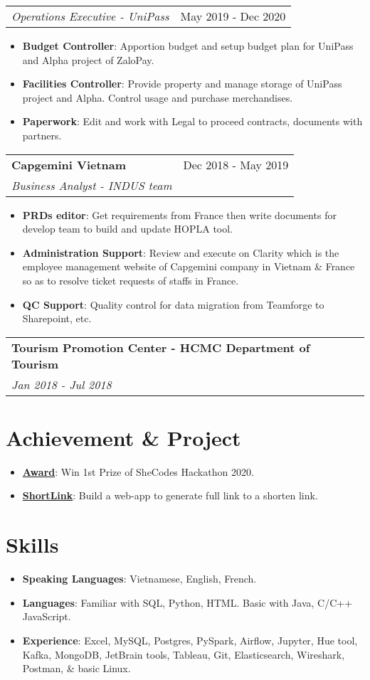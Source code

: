 \documentclass[letterpaper,11pt]{article}
\makeatletter
\newcommand{\resumeItem}[2]{
  \item\small{
    \textbf{#1}{: #2 \vspace{-2pt}}
  }
}
\newcommand{\resumeSubheading}[4]{
  \vspace{-1pt}
  \item
    \begin{tabular*}{0.97\textwidth}{l@{\extracolsep{\fill}}r}
      \textbf{#1} & #2 \\
      \textit{\small#3} & \textit{\small #4} \\
    \end{tabular*}\vspace{-5pt}
}
\newcommand{\resumeSubheadingNoTitle}[2]{
  \vspace{-1pt}
    \begin{tabular*}{0.97\textwidth}{l@{\extracolsep{\fill}}r}
      \textit{\small#1} & #2 \\
    \end{tabular*}\vspace{-5pt}
}
\newcommand{\resumeSubItem}[2]{\resumeItem{#1}{#2}\vspace{-4pt}}
\newcommand{\resumeSubHeadingListStart}{\begin{itemize}[leftmargin=*]}
\newcommand{\resumeSubHeadingListEnd}{\end{itemize}}
\newcommand{\resumeItemListStart}{\begin{itemize}}
\newcommand{\resumeItemListEnd}{\end{itemize}\vspace{-5pt}}
\makeatother
\begin{document}
    \resumeSubheadingNoTitle
      {Operations Executive - UniPass}{May 2019 - Dec 2020}
      \resumeItemListStart
        \resumeItem{Budget Controller}
          {Apportion budget and setup budget plan for UniPass and Alpha project of ZaloPay.} 
        \resumeItem{Facilities Controller}
          {Provide property and manage storage of UniPass project and Alpha. Control usage and purchase merchandises.}
        \resumeItem{Paperwork}
          {Edit and work with Legal to proceed contracts, documents with partners. }
      \resumeItemListEnd
      
    \resumeSubheading
      {Capgemini Vietnam}{Dec 2018 - May 2019}
      {Business Analyst - INDUS team}{}
      \resumeItemListStart
        \resumeItem{PRDs editor}
          {Get requirements from France then write documents for develop team to build and update HOPLA tool.} 
        \resumeItem{Administration Support}
            {Review and execute on Clarity which is the employee management website of Capgemini company in Vietnam \& France so as to resolve ticket requests of staffs in France. }
        \resumeItem{QC Support}    
            {Quality control for data migration from Teamforge to Sharepoint, etc. }
      \resumeItemListEnd


    \resumeSubheading
      {Tourism Promotion Center - HCMC Department of Tourism}{}{Jan 2018 - Jul 2018}
  \resumeSubHeadingListEnd
  
  
\section{Achievement \& Project}
  \resumeSubHeadingListStart 
    \resumeSubItem{\href{}{Award}}
      {Win 1st Prize of SheCodes Hackathon 2020. }
    \resumeSubItem{\href{https://github.com/tuyen-nnt/shortenLink}{ShortLink}}
      {Build a web-app to generate full link to a shorten link.}
\resumeSubHeadingListEnd

  
\section{Skills}
  \resumeSubHeadingListStart
    \resumeSubItem{Speaking Languages}
      {Vietnamese, English, French.}
    \resumeSubItem{Languages}
      {Familiar with SQL, Python, HTML. Basic with Java, C/C++ JavaScript.}
    \resumeSubItem{Experience}
      {Excel, MySQL, Postgres, PySpark, Airflow, Jupyter, Hue tool, Kafka, MongoDB, JetBrain tools, Tableau, Git, Elasticsearch, Wireshark, Postman, \& basic Linux.}
\resumeSubHeadingListEnd
  
\end{document}
